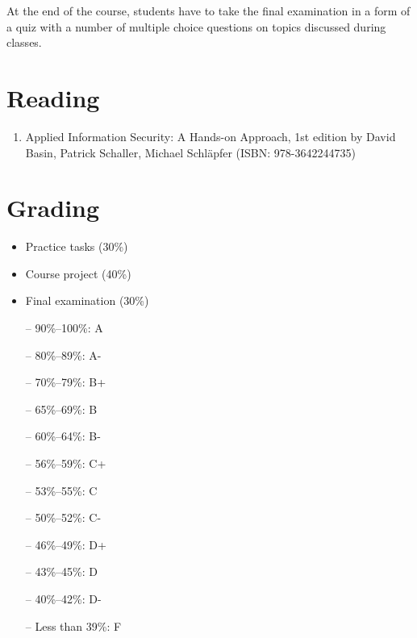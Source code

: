 \documentclass[12pt,a4paper,oneside]{article}
\begin{document}
        At the end of the course, students have to take the final examination in
        a form of a quiz with a number of multiple choice questions on topics
        discussed during classes.

    \section{Reading}

        \begin{enumerate}
            \item Applied Information Security: A Hands-on Approach, 1st edition by David Basin, Patrick Schaller, Michael Schläpfer (ISBN: 978-3642244735)
        \end{enumerate}

    \section{Grading}

        \begin{itemize}
            \item Practice tasks (30\%)
            \item Course project (40\%)
            \item Final examination (30\%)
        \end{itemize}

        \begin{itemize} \itemsep-10pt \parskip0pt 
            \item[--] 90\%--100\%: A\\
            \item[--] 80\%--89\%: A-\\
            \item[--] 70\%--79\%: B+\\
            \item[--] 65\%--69\%: B\\
            \item[--] 60\%--64\%: B-\\
            \item[--] 56\%--59\%: C+\\
            \item[--] 53\%--55\%: C\\
            \item[--] 50\%--52\%: C-\\
            \item[--] 46\%--49\%: D+\\
            \item[--] 43\%--45\%: D\\
            \item[--] 40\%--42\%: D-\\
            \item[--] Less than 39\%: F
        \end{itemize}
\end{document}
